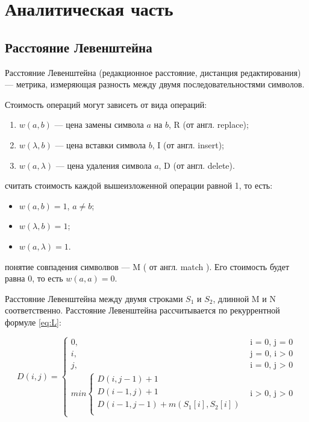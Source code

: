 \chapter{Аналитическая часть}
\section{Расстояние Левенштейна}

Расстояние Левенштейна \cite{levenshtein} (редакционное расстояние, дистанция редактирования) --- метрика, измеряющая разность между двумя последовательностями символов.

\noindent Стоимость операций могут зависеть от вида операций:
\begin{enumerate}
	\item $w(a, b)$ --- цена замены символа $a$ на $b$, R (от англ. replace);
	\item $w(\lambda, b)$ --- цена вставки символа $b$, I (от англ. insert);
	\item $w(a, \lambda)$ --- цена удаления символа $a$, D (от англ. delete).
\end{enumerate}

 считать стоимость каждой вышеизложенной операции равной 1, то есть:
\begin{itemize}
	\item $w(a, b) = 1$, $a \neq b$;
	\item $w(\lambda, b) = 1$;
	\item $w(a, \lambda) = 1$.
\end{itemize}

 понятие совпадения символвов --- M ( от англ. match ). Его стоимость будет равна 0, то есть $w(a, a) = 0$.

Расстояние Левенштейна между двумя строками $S_{1}$ и $S_{2}$, длинной M и N соответственно. Расстояние Левенштейна рассчитывается по рекуррентной формуле \ref{eq:L}:

\begin{equation}
	\label{eq:L}
	D(i, j) =
	\begin{cases}
		0, &\text{i = 0, j = 0}\\
		i, &\text{j = 0, i > 0}\\
		j, &\text{i = 0, j > 0}\\
		min \begin{cases}
			D(i, j - 1) + 1\\
			D(i - 1, j) + 1\\
			D(i - 1, j - 1) +  m(S_{1}[i], S_{2}[i]) \\
		\end{cases}
		&\text{i > 0, j > 0}
	\end{cases}
\end{equation}

